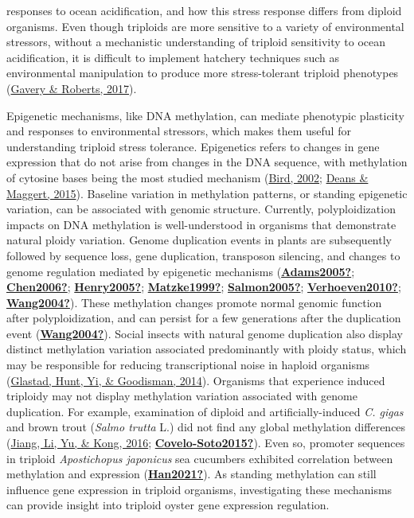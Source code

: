 \documentclass [11pt, proquest] {uwthesis}[2015/03/03]
\begin{document}
responses to ocean acidification, and how this stress response differs from diploid organisms. Even though triploids are more sensitive to a variety of environmental stressors, without a mechanistic understanding of triploid sensitivity to ocean acidification, it is difficult to implement hatchery techniques such as environmental manipulation to produce more stress-tolerant triploid phenotypes (\protect\hyperlink{ref-Gavery2017}{Gavery \& Roberts, 2017}).

Epigenetic mechanisms, like DNA methylation, can mediate phenotypic plasticity and responses to environmental stressors, which makes them useful for understanding triploid stress tolerance. Epigenetics refers to changes in gene expression that do not arise from changes in the DNA sequence, with methylation of cytosine bases being the most studied mechanism (\protect\hyperlink{ref-Bird2002}{Bird, 2002}; \protect\hyperlink{ref-Deans2015}{Deans \& Maggert, 2015}). Baseline variation in methylation patterns, or standing epigenetic variation, can be associated with genomic structure. Currently, polyploidization impacts on DNA methylation is well-understood in organisms that demonstrate natural ploidy variation. Genome duplication events in plants are subsequently followed by sequence loss, gene duplication, transposon silencing, and changes to genome regulation mediated by epigenetic mechanisms (\protect\hyperlink{ref-Adams2005}{\textbf{Adams2005?}}; \protect\hyperlink{ref-Chen2006}{\textbf{Chen2006?}}; \protect\hyperlink{ref-Henry2005}{\textbf{Henry2005?}}; \protect\hyperlink{ref-Matzke1999}{\textbf{Matzke1999?}}; \protect\hyperlink{ref-Salmon2005}{\textbf{Salmon2005?}}; \protect\hyperlink{ref-Verhoeven2010}{\textbf{Verhoeven2010?}}; \protect\hyperlink{ref-Wang2004}{\textbf{Wang2004?}}). These methylation changes promote normal genomic function after polyploidization, and can persist for a few generations after the duplication event (\protect\hyperlink{ref-Wang2004}{\textbf{Wang2004?}}). Social insects with natural genome duplication also display distinct methylation variation associated predominantly with ploidy status, which may be responsible for reducing transcriptional noise in haploid organisms (\protect\hyperlink{ref-Glastad2014}{Glastad, Hunt, Yi, \& Goodisman, 2014}). Organisms that experience induced triploidy may not display methylation variation associated with genome duplication. For example, examination of diploid and artificially-induced \emph{C. gigas} and brown trout (\emph{Salmo trutta} L.) did not find any global methylation differences (\protect\hyperlink{ref-Jiang2016}{Jiang, Li, Yu, \& Kong, 2016}; \protect\hyperlink{ref-Covelo-Soto2015}{\textbf{Covelo-Soto2015?}}). Even so, promoter sequences in triploid \emph{Apostichopus japonicus} sea cucumbers exhibited correlation between methylation and expression (\protect\hyperlink{ref-Han2021}{\textbf{Han2021?}}). As standing methylation can still influence gene expression in triploid organisms, investigating these mechanisms can provide insight into triploid oyster gene expression regulation.
\end{document}
